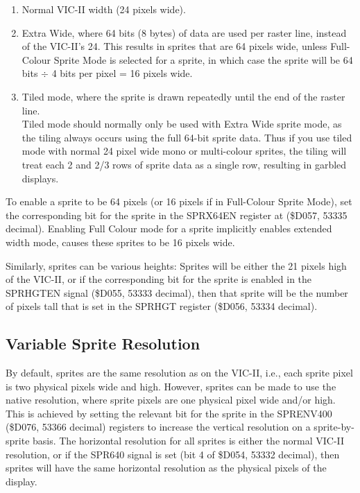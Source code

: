 \begin{enumerate}
\item Normal VIC-II width (24 pixels wide).
\item Extra Wide, where 64 bits (8 bytes) of data are used per raster line, instead of the VIC-II's 24.
  This results in sprites that are 64 pixels wide, unless Full-Colour Sprite Mode is selected for a sprite,
  in which case the sprite will be 64 bits $\div$ 4 bits per pixel = 16 pixels wide.
\item Tiled mode, where the sprite is drawn repeatedly until the end of the raster line. \\
  Tiled mode should normally only be used with Extra Wide sprite mode, as the tiling always occurs using the full
64-bit sprite data. Thus if you use tiled mode with normal 24 pixel wide mono or multi-colour sprites, the tiling will treat each 2 and 2/3 rows of sprite data as a single row, resulting in garbled displays.
\end{enumerate}

To enable a sprite to be 64 pixels (or 16 pixels if in Full-Colour Sprite Mode), set the corresponding bit for the sprite in the SPRX64EN register at (\$D057, 53335 decimal).  Enabling Full Colour mode for a sprite implicitly enables extended width mode, causes these sprites to be 16 pixels wide.

Similarly, sprites can be various heights:  Sprites will be either the 21 pixels high of the VIC-II, or if the corresponding bit for the sprite is enabled in the SPRHGTEN signal (\$D055, 53333 decimal), then that sprite will be the number of pixels tall that is set in the SPRHGT
register (\$D056, 53334 decimal).

\subsection{Variable Sprite Resolution}

By default, sprites are the same resolution as on the VIC-II, i.e., each sprite pixel is two physical pixels wide and high.
However, sprites can be made to use the native resolution, where sprite pixels are one physical pixel wide and/or high.
This is achieved by setting the relevant bit for the sprite in the SPRENV400 (\$D076, 53366 decimal) registers to increase the
vertical resolution on a sprite-by-sprite basis.  The horizontal resolution for all sprites is either the normal VIC-II resolution, or if the SPR640 signal
is set (bit 4 of \$D054, 53332 decimal), then sprites will have the same horizontal resolution as the physical pixels of the display.

